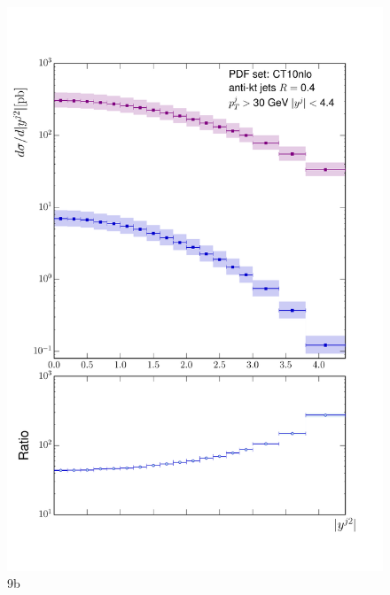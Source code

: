 	\begin{figure}[h]
		\centering
		\includegraphics[width=0.8\linewidth]{Figures/ATLAS_Z_100TeV_9b.pdf}
		\caption{9b}
		\label{fig:emissionsites}
	\end{figure}

